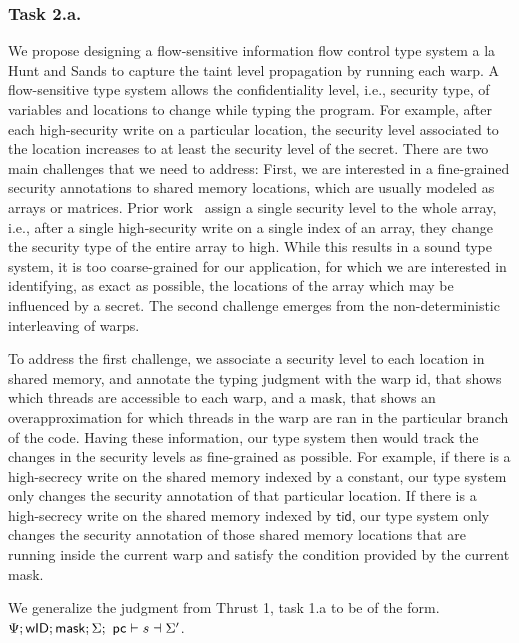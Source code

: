 \subsubsection{Task 2.a.} 
%
We propose designing a flow-sensitive information flow control type system a la Hunt and Sands\cite{hunt2006popl}  to capture the taint level propagation by running each warp.
%
A flow-sensitive type system allows the confidentiality level,
i.e., security type, of variables and locations to change while typing the program. 
%
For example, after each high-security write on a particular location, the security level associated to the location increases to at least the security level of the secret.
%
There are two main challenges that we need to address: First, we are interested in a fine-grained security annotations to shared memory locations, which are usually modeled as arrays or matrices.
%
Prior work~\cite{?} assign a single security level to the whole array, i.e., after a single high-security write on a single index of an array, they change the security type of the entire array to high.
%
While this results in a sound type system, it is too coarse-grained for our application, for which we are interested in identifying, as exact as possible, the locations of the array which may be influenced by a secret. 
%
The second challenge emerges from the non-deterministic interleaving of warps.
%

To address the first challenge, we associate a security level to each location in shared memory, and annotate the typing judgment with the warp id, that shows which threads are accessible to each warp, and a mask, that shows an overapproximation for which threads in the warp are ran in the particular branch of the code.
% 
Having these information, our type system then would track the changes in the security levels as fine-grained as possible.
%
For example, if there is a high-secrecy write on the shared memory indexed by a constant, our type system only changes the security annotation of that particular location.
%
If there is a high-secrecy write on the shared memory indexed by $\mathsf{tid}$, our type system only changes the security annotation of those shared memory locations that are running inside the current warp and satisfy the condition provided by the current mask.

We generalize the judgment from Thrust 1, task 1.a to be of the form.
%
$\Psi; \mathsf{wID};\mathsf{mask};  \Sigma; ~\mathsf{pc}\vdash s \dashv \Sigma'$.

